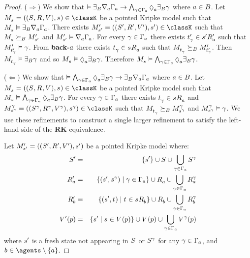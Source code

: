 \begin{proof}
($\Rightarrow$) 
We show that $\entails \somerefsBs \coversA \Gamma_\agentA \implies \bigwedge_{\gamma \in \Gamma_\agentA} \possibleA \somerefsBs \gamma$ where $\agentA \in \agentsB$.
Let $\kPModelAndTuple{\kStateS} \in \classK$ be a pointed Kripke model such that $\kPModel{\kStateS} \entails \somerefsBs \coversA \Gamma_\agentA$.
There exists $\kPModelAndTupleP{\kStateSP} \in \classK$ such that $\kPModel{\kStateS} \simulatesBs \kPModelP{\kStateSP}$ and $\kPModelP{\kStateSP} \entails \coversA \Gamma_\agentA$.
For every $\gamma \in \Gamma_\agentA$ there exists $\kStateTP_\gamma \in \kSuccessorsPA{\kStateSP}$ such that $\kPModelP{\kStateTP_\gamma} \entails \gamma$.
From {\bf back-$\agentA$} there exists $\kStateT_\gamma \in \kSuccessorsA{\kStateS}$ such that $\kPModel{\kStateT_\gamma} \simulatesBs \kPModelP{\kStateTP_\gamma}$.
Then $\kPModel{\kStateT_\gamma} \entails \somerefsBs \gamma$ and so $\kPModel{\kStateS} \entails \possibleA \somerefsBs \gamma$.
Therefore $\kPModel{\kStateS} \entails \bigwedge_{\gamma \in \Gamma_\agentA} \possibleA \somerefsBs \gamma$.

($\Leftarrow$) 
We show that $\entails \bigwedge_{\gamma \in \Gamma_\agentA} \possibleA \somerefsBs \gamma \implies \somerefsBs \coversA \Gamma_\agentA$ where $\agentA \in \agentsB$.
Let $\kPModelAndTuple{\kStateS} \in \classK$ be a pointed Kripke model such that $\kPModel{\kStateS} \entails \bigwedge_{\gamma \in \Gamma_\agentA} \possibleA \somerefsBs \gamma$.
For every $\gamma \in \Gamma_\agentA$ there exists $\kStateT_\gamma \in \kSuccessorsA{\kStateS}$ and $\kPModelAndTuple[\gamma]{\kStateS[\gamma]} \in \classK$ such that $\kPModel{\kStateT_\gamma} \simulatesBs \kPModel[\gamma]{\kStateS[\gamma]}$ and $\kPModel[\gamma]{\kStateS[\gamma]} \entails \gamma$.
We use these refinements to construct a single larger refinement to satisfy the left-hand-side of the {\bf RK} equivalence.

Let $\kPModelAndTupleP{\kStateSP}$ be a pointed Kripke model where:
\begin{eqnarray*}
    \kStatesP &=& \{\kStateSP\} \cup \kStates \cup \bigcup_{\gamma \in \Gamma_\agentA} \kStates[\gamma]\\
    \kAccessibilityPA &=& \{(\kStateSP, \kStateS[\gamma]) \mid \gamma \in \Gamma_\agentA\} \cup \kAccessibilityA \cup \bigcup_{\gamma \in \Gamma_\agentA} \kAccessibilityA[\gamma]\\
    \kAccessibilityPB &=& \{(\kStateSP, \kStateT) \mid \kStateT \in \kSuccessorsB{\kStateS}\} \cup \kAccessibilityB \cup \bigcup_{\gamma \in \Gamma_\agentA} \kAccessibilityB[\gamma]\\
    \kValuationP(\atomP) &=& \{\kStateSP \mid \kStateS \in \kValuation(\atomP)\} \cup \kValuation(\atomP) \cup \bigcup_{\gamma \in \Gamma_\agentA} \kValuation[\gamma](\atomP)
\end{eqnarray*}
where $\kStateSP$ is a fresh state not appearing in $\kStates$ or $\kStates[\gamma]$ for any $\gamma \in \Gamma_\agentA$, and $\agentB \in \agents \setminus \{\agentA\}$.


\end{proof}
